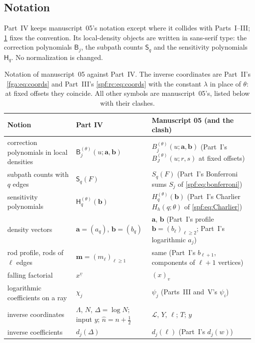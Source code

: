\documentclass[11pt]{article}
\numberwithin{equation}{section}
\theoremstyle{definition}
\theoremstyle{remark}
\theoremstyle{definition}
\newcommand{\fall}[2]{{#1}^{\underline{#2}}}
\newcommand{\mga}{\boldsymbol a}
\newcommand{\mgb}{\boldsymbol b}
\newcommand{\mgm}{\mathbf m}
\begin{document}
\subsection{Notation}
\label{spf:mg:sec:notation}

Part~IV keeps manuscript~05's notation except where it collides with
Parts~I--III; \cref{spf:mg:tab:dictionary} fixes the convention. Its
local-density objects are written in sans-serif type: the correction
polynomials $\mathsf B_j$, the subpath counts $\mathsf S_q$ and the
sensitivity polynomials $\mathsf H_q$. No normalization is changed.

\begin{table}[htbp]
\centering\small
\renewcommand{\arraystretch}{1.12}
\begin{tabular}{@{}>{\raggedright\arraybackslash}p{}>{\raggedright\arraybackslash}p{}>{\raggedright\arraybackslash}p{}@{}}
\toprule
Notion & Part IV & Manuscript 05 (and the clash)\\
\midrule
correction polynomials in local densities & $\mathsf B_j^{(\theta)}(u;\mga,\mgb)$ &
$B_j^{(\theta)}(u;\mathbf a,\mathbf b)$ (Part~I's $B_J^{(\theta)}(u;r,s)$ at fixed offsets)\\
subpath counts with $q$ edges & $\mathsf S_q(F)$ & $S_q(F)$ (Part~I's Bonferroni sums $S_j$ of \eqref{spf:eq:bonferroni})\\
sensitivity polynomials & $\mathsf H_q^{(\theta)}(\mgb)$ & $H_q^{(\theta)}(\mathbf b)$ (Part~I's Charlier $H_h(q;\theta)$ of \eqref{spf:eq:Charlier})\\
density vectors & $\mga=(a_q)$, $\mgb=(b_q)$ & $\mathbf a$, $\mathbf b$ (Part~I's profile $\mathbf b=(b_\ell)_{\ell\ge2}$; Part~I's logarithmic $a_j$)\\
rod profile, rods of $\ell$ edges & $\mgm=(m_\ell)_{\ell\ge1}$ & same (Part~I's $b_{\ell+1}$, components of $\ell+1$ vertices)\\
falling factorial & $\fall xv$ & $(x)_v$\\
logarithmic coefficients on a ray & $\chi_j$ & $\psi_j$ (Parts~III and~V's $\psi_i$)\\
inverse coordinates & $\Lambda$, $N$, $\Delta=\log N$; input $y$; $\hat n=n+\frac12$ & $\mathcal L$, $Y$, $\ell$; $T$; $y$\\
inverse coefficients & $d_j(\Delta)$ & $d_j(\ell)$ (Part~I's $d_j(w)$)\\
\bottomrule
\end{tabular}
\caption{Notation of manuscript~05 against Part~IV. The inverse coordinates
are Part~II's \eqref{fga:eq:coords} and Part~III's \eqref{spf:rc:eq:coords}
with the constant $\lambda$ in place of $\theta$: at fixed offsets they
coincide. All other symbols are manuscript~05's, listed below with their
clashes.}
\label{spf:mg:tab:dictionary}
\end{table}
\end{document}
